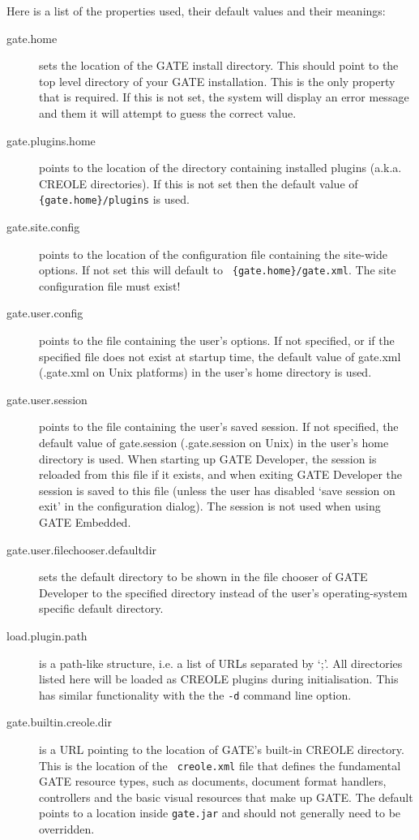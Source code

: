 Here is a list of the properties used, their default values and their meanings:
\begin{description}
\item[gate.home] sets the location of the GATE install directory. This should
point to the top level directory of your GATE installation. This is the only
property that is required. If this is not set, the system will display an error
message and them it will attempt to guess the correct value.
\item[gate.plugins.home] points to the location of the directory containing 
installed plugins (a.k.a. CREOLE directories). If this is not set then the
default value of {\tt \{gate.home\}/plugins} is used.
\item[gate.site.config] points to the location of the configuration file
containing the site-wide options. If not set this will default to {\tt
\{gate.home\}/gate.xml}. The site configuration file must exist!
\item[gate.user.config] points to the file containing the user's options. If
not specified, or if the specified file does not exist at startup time, the
default value of gate.xml (.gate.xml on Unix platforms) in the user's home
directory is used.
\item[gate.user.session] points to the file containing the user's saved
session.  If not specified, the default value of gate.session
(.gate.session on Unix) in the user's home directory is used.  When
starting up GATE Developer, the session is reloaded from this file if
it exists, and when exiting GATE Developer the session is saved to
this file (unless the user has disabled `save session on exit' in
the configuration dialog).  The session is not used when using GATE Embedded.
\item[gate.user.filechooser.defaultdir] sets the default directory to
be shown in the file chooser of GATE Developer  
to the specified directory instead of the 
user's operating-system specific default directory.
\item[load.plugin.path] is a path-like structure, i.e. a list of URLs
separated by `;'.
All directories listed here will be loaded as CREOLE plugins during
initialisation. This has similar functionality with the the {\tt -d} command line 
option.
\item[gate.builtin.creole.dir] is a URL pointing to the location of GATE's
built-in CREOLE directory.  This is the location of the {\tt
creole.xml} file that defines the fundamental GATE resource types,
such as documents, document format handlers, controllers and the basic
visual resources that make up GATE.  The default points to a
location inside {\tt gate.jar} and should not generally need to be
overridden.
\end{description}

